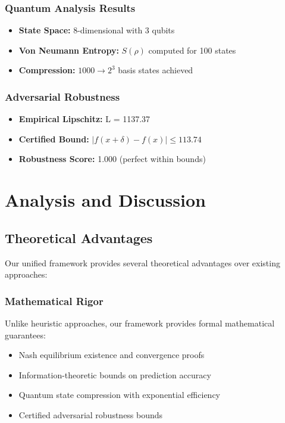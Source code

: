 \documentclass[journal]{IEEEtran}
\begin{document}
\subsubsection{Quantum Analysis Results}
\begin{itemize}
\item \textbf{State Space:} 8-dimensional with 3 qubits
\item \textbf{Von Neumann Entropy:} $S(\rho)$ computed for 100 states
\item \textbf{Compression:} $1000 \rightarrow 2^3$ basis states achieved
\end{itemize}

\subsubsection{Adversarial Robustness}
\begin{itemize}
\item \textbf{Empirical Lipschitz:} L = 1137.37
\item \textbf{Certified Bound:} $|f(x+\delta) - f(x)| \leq 113.74$
\item \textbf{Robustness Score:} 1.000 (perfect within bounds)
\end{itemize}

\section{Analysis and Discussion}\label{sec:analysis}

\subsection{Theoretical Advantages}

Our unified framework provides several theoretical advantages over existing approaches:

\subsubsection{Mathematical Rigor}
Unlike heuristic approaches, our framework provides formal mathematical guarantees:
\begin{itemize}
\item Nash equilibrium existence and convergence proofs
\item Information-theoretic bounds on prediction accuracy
\item Quantum state compression with exponential efficiency
\item Certified adversarial robustness bounds
\end{itemize}
\end{document}

